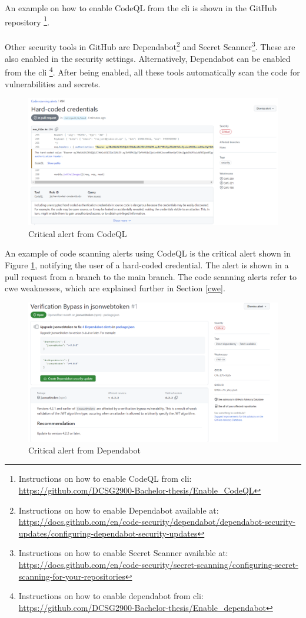 An example on how to enable CodeQL from the \acrshort{cli} is shown in the GitHub repository \footnote{Instructions on how to enable CodeQL from cli: \url{https://github.com/DCSG2900-Bachelor-thesis/Enable_CodeQL}}.
\\~\\
Other security tools in GitHub are Dependabot\footnote{Instructions on how to enable Dependabot available at: \url{https://docs.github.com/en/code-security/dependabot/dependabot-security-updates/configuring-dependabot-security-updates}} and Secret Scanner\footnote{Instructions on how to enable Secret Scanner available at: \url{https://docs.github.com/en/code-security/secret-scanning/configuring-secret-scanning-for-your-repositories}}. These are also enabled in the security settings. Alternatively, Dependabot can be enabled from the \acrshort{cli} \footnote{Instructions on how to enable dependabot from cli: \url{https://github.com/DCSG2900-Bachelor-thesis/Enable_dependabot}}. After being enabled, all these tools automatically scan the code for vulnerabilities and secrets.

\vspace{2mm}
\begin{figure}[H]
    \centering
    \includegraphics[width=0.8\columnwidth]{Images/codescan.png}
    \caption{Critical alert from CodeQL}
    \label{fig: Critical alert CodeQL}
\end{figure}

An example of code scanning alerts using CodeQL is the critical alert shown in Figure \ref{fig: Critical alert CodeQL}, notifying the user of a hard-coded credential. The alert is shown in a pull request from a branch to the main branch. The code scanning alerts refer to \acrshort{cwe} weaknesses, which are explained further in Section \ref{cwe}.

\vspace{2mm}
\begin{figure}[H]
    \centering
    \includegraphics[width=0.8\columnwidth]{Images/dependabotalert.png}
    \caption{Critical alert from Dependabot}
    \label{fig: Critical alert from Dependabot}
\end{figure}

